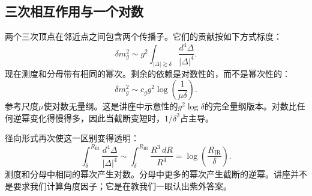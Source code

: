 \subsection{三次相互作用与一个对数}

两个三次顶点在邻近点之间包含两个传播子。它们的贡献按如下方式标度：
\begin{equation}
\delta m_g^2
\sim
g^2\int_{|\Delta|\gtrsim\delta}
\frac{d^4\Delta}{|\Delta|^4}.
\label{eq:cubic-loop}
\end{equation}
现在测度和分母带有相同的幂次。剩余的依赖是对数性的，而不是幂次性的：
\begin{equation}
\delta m_g^2
\sim
c_g g^2\log\!\left(\frac{1}{\mu\delta}\right).
\label{eq:cubic-log}
\end{equation}
参考尺度\(\mu\)使对数无量纲。这是讲座中示意性的\(g^2\log\delta\)的完全量纲版本。对数比任何逆幂变化得慢得多，因此当截断变短时，\(1/\delta^2\)占主导。

径向形式再次使这一区别变得透明：
\begin{equation}
\int_{\delta}^{R_{\mathrm{IR}}}
\frac{d^4\Delta}{|\Delta|^4}
\sim
\int_{\delta}^{R_{\mathrm{IR}}}\frac{R^3\,dR}{R^4}
=\log\!\left(\frac{R_{\mathrm{IR}}}{\delta}\right).
\end{equation}
测度和分母中相同的幂次产生对数。分母中更多的幂次产生截断的逆幂。讲座并不是要求我们计算角度因子；它是在教我们一眼认出紫外答案。

\begin{classroomqa}
\end{classroomqa}

\begin{classroomqa}
\end{classroomqa}

\begin{classroomqa}
\end{classroomqa}

